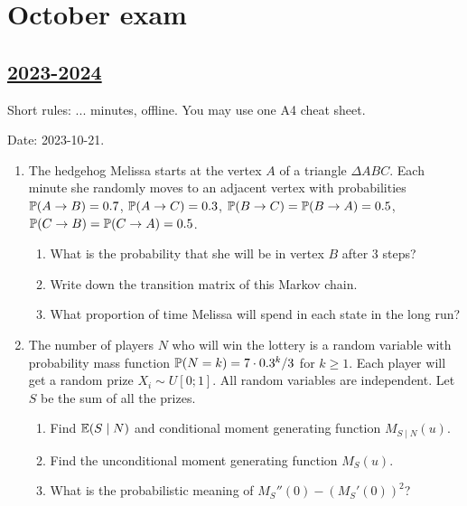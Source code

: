 
\newpage
\thispagestyle{empty}
\section{October exam}



\subsection[2023-2024]{\hyperref[sec:sol_kr_01_2023_2024]{2023-2024}}
\label{sec:kr_01_2023_2024} %

Short rules: ... minutes, offline. You may use one A4 cheat sheet.

Date: 2023-10-21.


\begin{enumerate}
  \item The hedgehog Melissa starts at the vertex $A$ of a triangle $\Delta ABC$.
  Each minute she randomly moves to an adjacent vertex with probabilities $\P(A \to B) = 0.7$, 
  $\P(A \to C) = 0.3$, $\P(B \to C) = \P(B \to A) = 0.5$,  $\P(C \to B) = \P(C \to A) = 0.5$.

  \begin{enumerate}
    \item What is the probability that she will be in vertex $B$ after 3 steps?
    \item Write down the transition matrix of this Markov chain. 
    \item What proportion of time Melissa will spend in each state in the long run?
  \end{enumerate}
  
  \item The number of players $N$ who will win the lottery
  is a random variable with probability mass function $\P(N = k) = 7\cdot 0.3^k / 3$ for $k\geq 1$.
  Each player will get a random prize $X_i \sim U[0;1]$.
  All random variables are independent. 
  Let $S$ be the sum of all the prizes. 

  \begin{enumerate}
    \item Find $\E(S \mid N)$ and conditional moment generating function $M_{S\mid N}(u)$.
    \item Find the unconditional moment generating function $M_S(u)$.
    \item What is the probabilistic meaning of $M_S''(0) - (M_S'(0))^2$? 
  \end{enumerate}


\end{enumerate}
